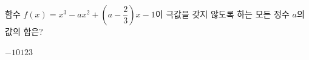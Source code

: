 함수 $f(x)=x^3-ax^2+\left(a-\dfrac{2}{3}\right)x-1$이 극값을 갖지 않도록 하는 모든 정수 $a$의 값의 합은?
\begin{choices32}{$-1$}{$0$}{$1$}{$2$}{$3$}\end{choices32}
